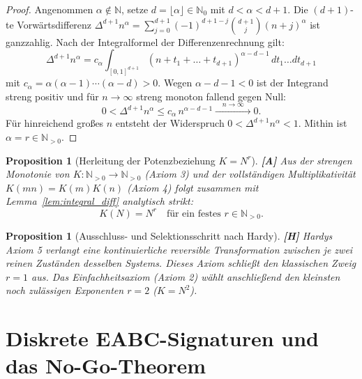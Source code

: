 \documentclass[11pt,a4paper,reqno]{amsart}
\newtheorem{proposition}[theorem]{Proposition}
\theoremstyle{definition}
\theoremstyle{remark}
\begin{document}
	\begin{proof}
		Angenommen $\alpha \notin \mathbb{N}$, setze $d = \lfloor \alpha \rfloor \in \mathbb{N}_0$ mit $d < \alpha < d+1$. Die $(d+1)$-te Vorw\"artsdifferenz $\Delta^{d+1} n^\alpha = \sum_{j=0}^{d+1} (-1)^{d+1-j} \binom{d+1}{j} (n+j)^\alpha$ ist ganzzahlig. Nach der Integralformel der Differenzenrechnung gilt:
		\begin{equation}
			\Delta^{d+1} n^\alpha = c_\alpha \int_{[0,1]^{d+1}} (n + t_1 + \dots + t_{d+1})^{\alpha - d - 1} \, dt_1 \dots dt_{d+1}
		\end{equation}
		mit $c_\alpha = \alpha(\alpha-1)\cdots(\alpha-d) > 0$. Wegen $\alpha - d - 1 < 0$ ist der Integrand streng positiv und f\"ur $n \to \infty$ streng monoton fallend gegen Null:
		\begin{equation}
			0 < \Delta^{d+1} n^\alpha \le c_\alpha \, n^{\alpha - d - 1} \xrightarrow{\quad n \to \infty \quad} 0.
		\end{equation}
		F\"ur hinreichend gro\ss{}es $n$ entsteht der Widerspruch $0 < \Delta^{d+1} n^\alpha < 1$. Mithin ist $\alpha = r \in \mathbb{N}_{>0}$.
	\end{proof}
	
	\begin{proposition}[Herleitung der Potenzbeziehung $K = N^r$] \textbf{[A]}
		Aus der strengen Monotonie von $K: \mathbb{N}_{>0} \to \mathbb{N}_{>0}$ (Axiom 3) \cite{Hardy2001} und der vollst\"andigen Multiplikativit\"at $K(mn) = K(m)K(n)$ (Axiom 4) \cite{Hardy2001} folgt zusammen mit Lemma~\ref{lem:integral_diff} analytisch strikt:
		\begin{equation}
			\boxed{ K(N) = N^r \quad \text{f\"ur ein festes } r \in \mathbb{N}_{>0}. }
		\end{equation}
	\end{proposition}
	
	\begin{proposition}[Ausschluss- und Selektionsschritt nach Hardy] \cite{Hardy2001} \textbf{[H]}
		Hardys Axiom 5 verlangt eine kontinuierliche reversible Transformation zwischen je zwei reinen Zust\"anden desselben Systems. Dieses Axiom schlie\ss{}t den klassischen Zweig $r=1$ aus. Das Einfachheitsaxiom (Axiom 2) w\"ahlt anschlie\ss{}end den kleinsten noch zul\"assigen Exponenten $r=2$ ($K=N^2$).
	\end{proposition}
	
	\section{Diskrete EABC-Signaturen und das No-Go-Theorem}
	
\end{document}
